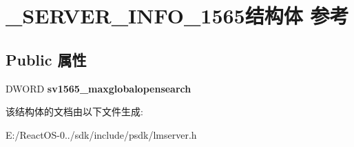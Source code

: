 \hypertarget{struct___s_e_r_v_e_r___i_n_f_o__1565}{}\section{\+\_\+\+S\+E\+R\+V\+E\+R\+\_\+\+I\+N\+F\+O\+\_\+1565结构体 参考}
\label{struct___s_e_r_v_e_r___i_n_f_o__1565}
\subsection*{Public 属性}
\begin{DoxyCompactItemize}
\item 
\mbox{\label{struct___s_e_r_v_e_r___i_n_f_o__1565_a2cd060166beae0cfa8780c06e212629e}} 
D\+W\+O\+RD {\bfseries sv1565\+\_\+maxglobalopensearch}
\end{DoxyCompactItemize}


该结构体的文档由以下文件生成\+:\begin{DoxyCompactItemize}
\item 
E\+:/\+React\+O\+S-\/0../sdk/include/psdk/lmserver.\+h\end{DoxyCompactItemize}
